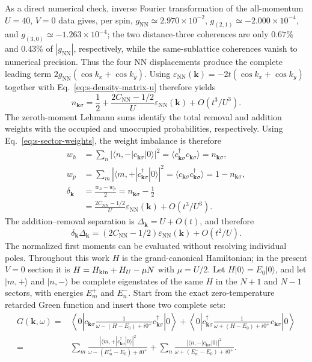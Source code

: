 \documentclass[10pt]{article}
\newcommand{\epsk}{\varepsilon_{\mathrm{NN}}(\mathbf{k})}
\newcommand{\Cnn}{C_{\mathrm{NN}}}
\newcommand{\dk}{\delta_{\mathbf{k}}}
\newcommand{\sep}{\Delta_{\mathbf{k}}}
\begin{document}
As a direct numerical check, inverse Fourier transformation of the
all-momentum $U=40$, $V=0$ data gives, per spin,
$g_{\mathrm{NN}}\simeq2.970\times10^{-2}$,
$g_{(2,1)}\simeq-2.000\times10^{-4}$, and
$g_{(3,0)}\simeq-1.263\times10^{-4}$; the two distance-three coherences are
only $0.67\%$ and $0.43\%$ of $|g_{\mathrm{NN}}|$, respectively, while the
same-sublattice coherences vanish to numerical precision.  Thus the four NN
displacements produce the complete leading term
$2g_{\mathrm{NN}}(\cos k_x+\cos k_y)$.  Using
$\epsk=-2t(\cos k_x+\cos k_y)$ together with
Eq.~\ref{eq:s-density-matrix-u} therefore yields
\begin{equation}
n_{\mathbf{k}\sigma}=\frac12+\frac{2\Cnn-1/2}{U}\epsk+O(t^3/U^3).
\label{eq:s-nk-u}
\end{equation}
The zeroth-moment Lehmann sums identify the total removal and addition
weights with the occupied and unoccupied probabilities, respectively.  Using
Eq.~\ref{eq:s-sector-weights}, the weight imbalance is therefore
\begin{equation}
\begin{aligned}
w_h
&=\sum_n\left|\langle n,-|c_{\mathbf k\sigma}|0\rangle\right|^2
=\langle c^\dagger_{\mathbf k\sigma}c_{\mathbf k\sigma}\rangle
=n_{\mathbf k\sigma},\\
w_p
&=\sum_m\left|\langle m,+|c^\dagger_{\mathbf k\sigma}|0\rangle\right|^2
=\langle c_{\mathbf k\sigma}c^\dagger_{\mathbf k\sigma}\rangle
=1-n_{\mathbf k\sigma},\\
\dk
&=\frac{w_h-w_p}{2}=n_{\mathbf k\sigma}-\frac12\\
&=\frac{2\Cnn-1/2}{U}\epsk+O(t^3/U^3).
\end{aligned}
\label{eq:s-delta-u}
\end{equation}
The addition--removal separation is $\sep=U+O(t)$, and therefore
\begin{equation}
\dk\sep=(2\Cnn-1/2)\epsk+O(t^2/U).
\label{eq:s-weight-u}
\end{equation}
The normalized first moments can be evaluated without resolving individual
poles.  Throughout this work $H$ is the grand-canonical Hamiltonian; in the
present $V=0$ section it is $H=H_{\rm kin}+H_U-\mu N$ with $\mu=U/2$.
Let $H|0\rangle=E_0|0\rangle$, and let $|m,+\rangle$ and $|n,-\rangle$ be
complete eigenstates of the same $H$ in the $N+1$ and $N-1$ sectors, with
energies $E_m^+$ and $E_n^-$.  Start from the exact zero-temperature
retarded Green function and insert those two complete sets:
\begin{equation}
\begin{aligned}
G(\mathbf k,\omega)
={}&\left\langle0\left|c_{\mathbf k\sigma}
 \frac{1}{\omega-(H-E_0)+i0^+}
 c^\dagger_{\mathbf k\sigma}\right|0\right\rangle+\left\langle0\left|c^\dagger_{\mathbf k\sigma}
 \frac{1}{\omega+(H-E_0)+i0^+}
 c_{\mathbf k\sigma}\right|0\right\rangle\\
={}&\sum_m
\frac{\left|\langle m,+|c^\dagger_{\mathbf k\sigma}|0\rangle\right|^2}
{\omega-(E_m^+-E_0)+i0^+}+\sum_n
\frac{\left|\langle n,-|c_{\mathbf k\sigma}|0\rangle\right|^2}
{\omega+(E_n^--E_0)+i0^+}.
\end{aligned}
\end{equation}
\end{document}
